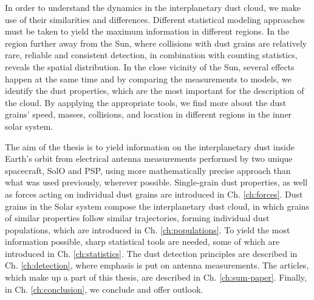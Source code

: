 In order to understand the dynamics in the interplanetary dust cloud, we make use of their similarities and differences. Different statistical modeling approaches must be taken to yield the maximum information in different regions. In the region further away from the Sun, where collisions with dust grains are relatively rare, reliable and consistent detection, in combination with counting statistics, reveals the spatial distribution. In the close vicinity of the Sun, several effects happen at the same time and by comparing the measurements to models, we identify the dust properties, which are the most important for the description of the cloud. By aapplying the appropriate tools, we find more about the dust grains' speed, masses, collisions, and location in different regions in the inner solar system.


The aim of the thesis is to yield information on the interplanetary dust inside Earth's orbit from electrical antenna measurements performed by two unique spacecraft, SolO and PSP, using more mathematically precise approach than what was used previously, wherever possible. Single-grain dust properties, as well as forces acting on individual dust grains are introduced in Ch. \ref{ch:forces}. Dust grains in the Solar system compose the interplanetary dust cloud, in which grains of similar properties follow similar trajectories, forming individual dust populations, which are introduced in Ch. \ref{ch:populations}. To yield the most information possible, sharp statistical tools are needed, some of which are introduced in Ch. \ref{ch:statistics}. The dust detection principles are described in Ch. \ref{ch:detection}, where emphasis is put on antenna measurements. The articles, which make up a part of this thesis, are described in Ch. \ref{ch:sum-paper}. Finally, in Ch. \ref{ch:conclusion}, we conclude and offer outlook.